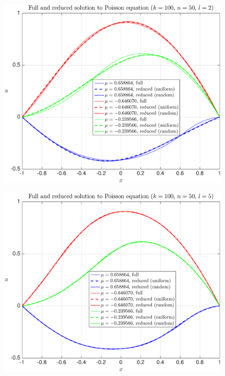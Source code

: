 \documentclass[11pt,a4paper]{article}
\theoremstyle{definition}
\theoremstyle{theorem}
\begin{document}
	\begin{figure}
		\center
		\includegraphics[scale=0.5]{fig13}
		\caption{}
	\end{figure}
	
	\begin{figure}
		\center
		\includegraphics[scale=0.5]{fig14}
		\caption{}
	\end{figure}
	
\end{document}
